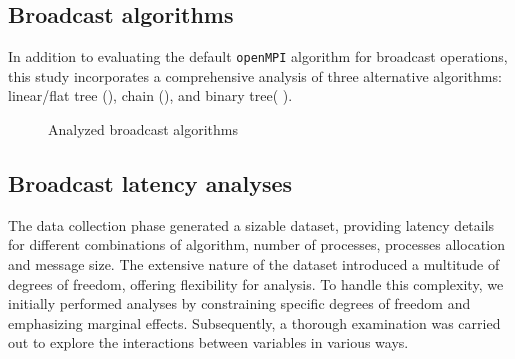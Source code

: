 \documentclass{article}
\begin{document}
\subsection{Broadcast algorithms}\label{subsection:broadcast_algorithms}
In addition to evaluating the default \texttt{openMPI} algorithm for broadcast operations, this study incorporates a comprehensive analysis of three alternative algorithms: linear/flat tree (), chain (), and binary tree( ).
\begin{figure}[htp]
    \centering
    \hfill
    \hfill
    \caption{\footnotesize Analyzed broadcast algorithms}
\end{figure}

\subsection{Broadcast latency analyses}\label{subsection:broadcast_latency}
The data collection phase generated a sizable dataset, providing latency details for different combinations of algorithm, number of processes, processes allocation and message size. The extensive nature of the dataset introduced a multitude of degrees of freedom, offering flexibility for analysis. To handle this complexity, we initially performed analyses by constraining specific degrees of freedom and emphasizing marginal effects. Subsequently, a thorough examination was carried out to explore the interactions between variables in various ways.
\end{document}
